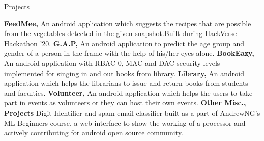 \begin{rubric}{Projects}

\entry* \textbf{FeedMee,} An android application which suggests the recipes that are possible from the vegetables detected in the given snapshot.Built during HackVerse Hackathon '20.  
\entry* \textbf{G.A.P,} An android application to predict the age group and gender of a person in the frame with the help of his/her eyes alone.
\entry* \textbf{BookEazy,} An android application with RBAC 0, MAC and DAC security levels implemented for singing in and out books from library. 
\entry* \textbf{Library,} An android application which helps the librarians to issue and return books from students and faculties.
\entry* \textbf{Volunteer,} An android application which helps the users to take part in events as volunteers or they can host their own events.
\entry* \textbf{Other Misc., Projects} Digit Identifier and spam email classifier built as a part of AndrewNG's ML Beginners course, a web interface to show the working of a processor and actively contributing for android open source community.
\end{rubric}